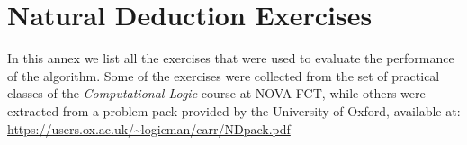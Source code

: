 
%


\chapter{Natural Deduction Exercises}
\label{nd-exercises}
In this annex we list all the exercises that were used to evaluate the performance of the algorithm. 
Some of the exercises were collected from the set of practical classes of the \textit{Computational Logic} course at NOVA FCT, 
while others were extracted from a problem pack provided by the University of Oxford, available at:
\url{https://users.ox.ac.uk/~logicman/carr/NDpack.pdf}

